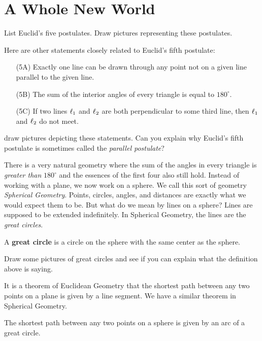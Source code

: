\newpage
\section{A Whole New World}	

\begin{prob}
List Euclid's five postulates. Draw pictures representing these
postulates.
\end{prob}

\begin{prob}
Here are other statements closely related to Euclid's fifth postulate:
\begin{enumerate}
\item[(5A)] Exactly one line can be drawn through any point not on a given line parallel to the given line. 
\item[(5B)] The sum of the interior angles of every triangle is equal to $180^\circ$.
\item[(5C)] If two lines $\ell_1$ and $\ell_2$ are both perpendicular to some third line, then 
$\ell_1$ and $\ell_2$ do not meet.
\end{enumerate}
draw pictures depicting these statements.  Can you explain why
Euclid's fifth postulate is sometimes called the \emph{parallel
postulate}?
\end{prob}

There is a very natural geometry where the sum of the angles in every
triangle is \textit{greater than} $180^\circ$ and the essences of the
first four also still hold. Instead of working with a plane, we now
work on a sphere. We call this sort of geometry
\textit{Spherical Geometry}. Points, circles, angles, and
distances are exactly what we would expect them to be. But what do we
mean by lines on a sphere?  Lines are supposed to be extended
indefinitely.  In Spherical Geometry, the lines are the \emph{great
circles}. 

\begin{dfn}
A \textbf{great circle} is a circle on the sphere with the same center
as the sphere.
\end{dfn}

\begin{prob}
Draw some pictures of great circles and see if you can explain what
the definition above is saying.
\end{prob}

It is a theorem of Euclidean Geometry that the shortest path between
any two points on a plane is given by a line segment. We have a
similar theorem in Spherical Geometry.
\begin{thm}
The shortest path between any two points on a sphere is given by an
arc of a great circle.
\end{thm}


